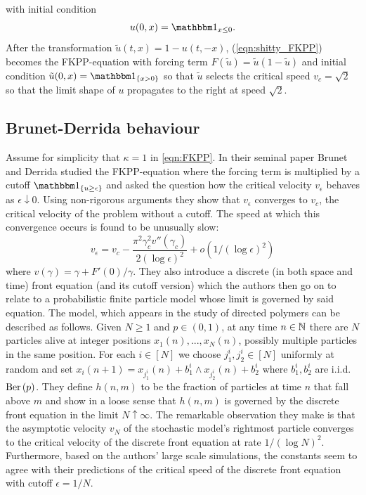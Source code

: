 with initial condition
\begin{equation}\nonumber
u(0, x) = \Ind_{x \leq 0}. 
\end{equation}
After the transformation $\tilde{u}(t, x) = 1 - u(t, - x)$, (\ref{eqn:shitty_FKPP}) becomes the FKPP-equation with forcing term $F(\tilde{u}) = \tilde{u}(1 - \tilde{u})$ and initial condition $\tilde{u}(0, x) = \Ind_{\{ x > 0\}}$ so that $\tilde{u}$ selects the critical speed $v_c = \sqrt{2}$ so that the limit shape of $u$ propagates to the right at speed $\sqrt{2}$. \\








\subsection{Brunet-Derrida behaviour}
Assume for simplicity that $\kappa = 1$ in \ref{eqn:FKPP}. In their seminal paper \cite{brunet1997shift} Brunet and Derrida studied the FKPP-equation where the forcing term is multiplied by a cutoff $\Ind_{\{ u \geq \epsilon\}}$ and asked the question how the critical velocity $v_\epsilon$ behaves as $\epsilon \downarrow 0$. Using non-rigorous arguments they show that $v_\epsilon$ converges to $v_c$, the critical velocity of the problem without a cutoff. The speed at which this convergence occurs is found to be unusually slow:
\begin{equation}\label{eqn:brun_der_prediction}
v_\epsilon = v_c - \frac{\pi^2 \gamma_c^2 v''(\gamma_c)}{2 (\log \epsilon)^2} + o(1/(\log \epsilon)^2) 
\end{equation}
where $v(\gamma) = \gamma + F'(0)/\gamma$. They also introduce a discrete (in both space and time) front equation (and its cutoff version) which the authors then go on to relate to a probabilistic finite particle model whose limit is governed by said equation. The model, which appears in the study of directed polymers can be described as follows. Given $N \geq 1$ and $p \in (0,1)$, at any time $n \in \mathbb{N}$ there are $N$ particles alive at integer positions $x_1(n), ..., x_N(n)$, possibly multiple particles in the same position. For each $i \in [N]$ we choose $j^i_1, j^i_2 \in [N]$ uniformly at random and set $x_i(n+1) = x_{j^i_1}(n) + b^i_1 \land x_{j^i_2}(n) + b^i_2$ where $b^i_1, b^i_2$ are i.i.d. $\text{Ber} \left( p \right)$. They define $h(n, m)$ to be the fraction of particles at time $n$ that fall above $m$ and show in a loose sense that $h(n,m)$ is governed by the discrete front equation in the limit $N \uparrow \infty$. The remarkable observation they make is that the asymptotic velocity $v_N$ of the stochastic model's rightmost particle converges to the critical velocity of the discrete front equation at rate $1/(\log N)^2$. Furthermore, based on the authors' large scale simulations, the constants seem to agree with their predictions of the critical speed of the discrete front equation with cutoff $\epsilon = 1/N$. \\

